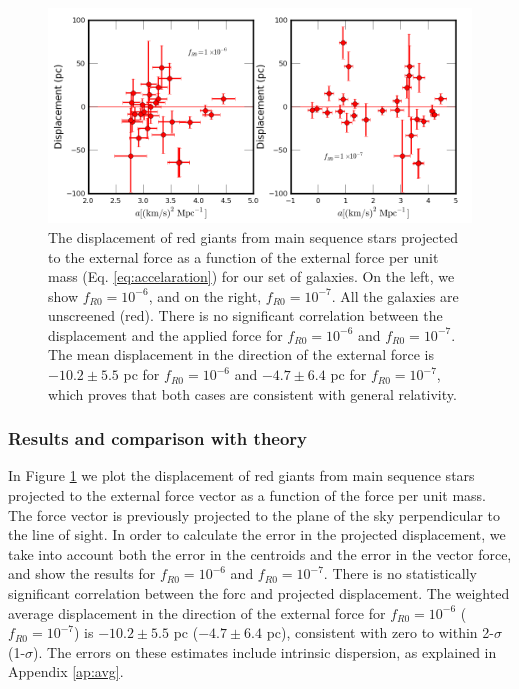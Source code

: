 \documentclass[useAMS,usenatbib,twocolumn]{mn2e}
\newcommand{\jakesays}[1]{{\color{red}[Jake says: #1]}}
\begin{document}
\begin{figure}
\includegraphics[scale=0.5]{figures/dispprojforce.png}
  \caption{The displacement of red giants from main sequence stars projected to
the external force as a function of the external force per unit mass
(Eq. \ref{eq:accelaration}) for our
set of galaxies.
On the left, we show $f_{R0}=10^{-6}$, and on the right, $f_{R0}=10^{-7}$. All
the galaxies are unscreened (red). There is no significant correlation between
the
displacement and the applied force for $f_{R0}=10^{-6}$ and $f_{R0}=10^{-7}$.
 The mean displacement in the direction of the 
external force is $-10.2\pm5.5$ pc for $f_{R0}=10^{-6}$ and $-4.7\pm6.4$ pc for
$f_{R0}=10^{-7}$, which proves that both cases are consistent with general
relativity.
\label{fig:rgdispprojforce}}
\end{figure}

\subsubsection{Results and comparison with theory}
In Figure \ref{fig:rgdispprojforce} we plot the displacement of red
giants from  main sequence stars projected to the external force vector as a 
function of the force per unit mass. The force vector is previously
projected to the plane of the sky perpendicular to the line of sight.
In order to calculate the error in the projected displacement, 
we take into account both the error in the centroids and the error in the
vector force, and show the results for $f_{R0}=10^{-6}$ and $f_{R0}=10^{-7}$.
There is no statistically significant correlation between the forc and
projected displacement.
The weighted average displacement in the direction of the 
external force for $f_{R0} = 10^{-6}$ ($f_{R0} = 10^{-7}$) is
$-10.2\pm5.5$ pc ($-4.7\pm6.4$ pc),
consistent with zero to within 2-$\sigma$ (1-$\sigma$).
The errors on these estimates include intrinsic dispersion, as explained
in Appendix \ref{ap:avg}.
\end{document}
